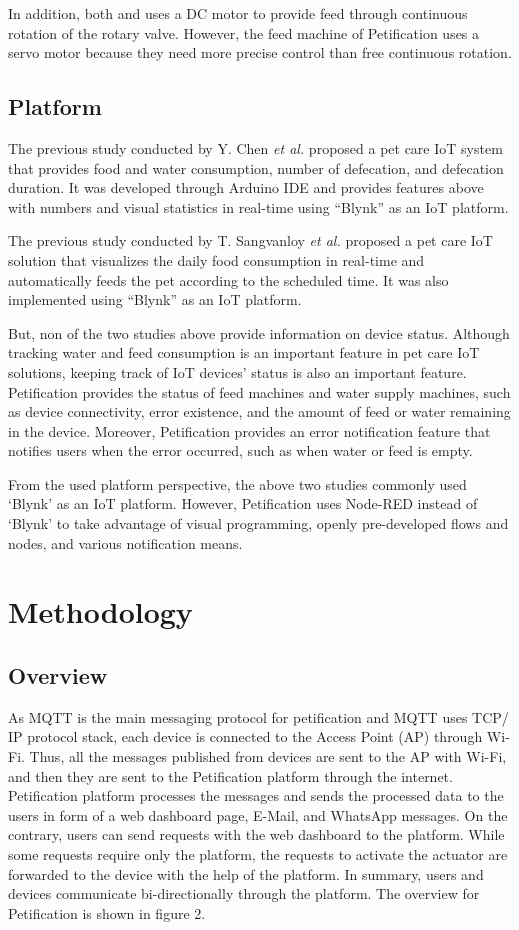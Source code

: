 \documentclass[conference]{IEEEtran}
\begin{document}
In addition, both \cite{b12} and \cite{b13} uses a DC motor to provide feed through continuous rotation of the rotary valve. However, the feed machine of Petification uses a servo motor because they need more precise control than free continuous rotation.\cite{b14} 

\subsection{Platform}
  The previous study conducted by Y. Chen \textit{et al.} \cite{b5}
proposed a pet care IoT system that provides food and water consumption, number of defecation, and defecation duration. It was developed through Arduino IDE and provides features above with numbers and visual statistics in real-time using “Blynk” as an IoT platform.

The previous study conducted by T. Sangvanloy \textit{et al.} \cite{b4} 
proposed a pet care IoT solution that visualizes the daily food consumption in real-time and automatically feeds the pet according to the scheduled time. It was also implemented using “Blynk” as an IoT platform.

But, non of the two studies above provide information on device status. Although tracking water and feed consumption is an important feature in pet care IoT solutions, keeping track of IoT devices’ status is also an important feature. Petification provides the status of feed machines and water supply machines, such as device connectivity, error existence, and the amount of feed or water remaining in the device. Moreover, Petification provides an error notification feature that notifies users when the error occurred, such as when water or feed is empty.

From the used platform perspective, the above two studies commonly used ‘Blynk’ as an IoT platform. However, Petification uses Node-RED instead of ‘Blynk’ to take advantage of visual programming, openly pre-developed flows and nodes, and various notification means.

\section{Methodology}
\subsection{Overview}
As MQTT is the main messaging protocol for petification and MQTT uses TCP/ IP protocol stack, each device is connected to the Access Point (AP) through Wi-Fi. Thus, all the messages published from devices are sent to the AP with Wi-Fi, and then they are sent to the Petification platform through the internet. Petification platform processes the messages and sends the processed data to the users in form of a web dashboard page, E-Mail, and WhatsApp messages. On the contrary, users can send requests with the web dashboard to the platform. While some requests require only the platform, the requests to activate the actuator are forwarded to the device with the help of the platform. In summary, users and devices communicate bi-directionally through the platform. The overview for Petification is shown in figure 2.
\end{document}
